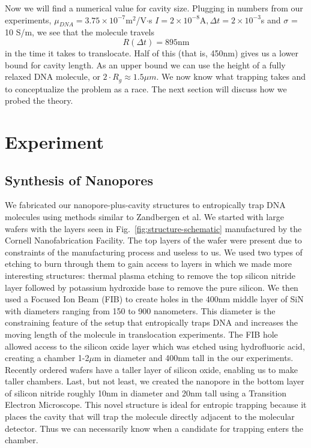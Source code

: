 \documentclass[aps,prl,preprint,groupedaddress]{revtex4}
\begin{document}
Now we will find a numerical value for cavity size.
Plugging in numbers from our experiments, \(\mu_{DNA} = 3.75 \times 10^{-7}\)m$^2$/V$\cdot$s \cite{mobility} \(I = 2\times 10^{-8}\mathrm{A}, \Delta t = 2 \times 10^{-3}\)s and \(\sigma\) = 10 S/m\cite{CRC}, we see that the molecule travels \[R(\Delta t) = 895 \mathrm{nm} \] in the time it takes to translocate.
Half of this (that is, 450nm) gives us a lower bound for cavity length.
As an upper bound we can use the height of a fully relaxed DNA molecule, or $2\cdot R_g \approx 1.5 \mu m$.
We now know what trapping takes and to conceptualize the problem as a race.
The next section will discuss how we probed the theory.

\section{Experiment}

\subsection{Synthesis of Nanopores}

We fabricated our nanopore-plus-cavity structures to entropically trap DNA molecules using methods similar to Zandbergen et al.\cite{nanopore-fabrication}
We started with large wafers with the layers seen in Fig.~\ref{fig:structure-schematic} manufactured by the Cornell Nanofabrication Facility.
The top layers of the wafer were present due to constraints of the manufacturing process and useless to us.
We used two types of etching to burn through them to gain access to layers in which we made more interesting structures: thermal plasma etching to remove the top silicon nitride layer followed by potassium hydroxide base to remove the pure silicon.
We then used a Focused Ion Beam (FIB) to create holes in the 400nm middle layer of SiN with diameters ranging from 150 to 900 nanometers.
This diameter is the constraining feature of the setup that entropically traps DNA and increases the moving length of the molecule in translocation experiments.
The FIB hole allowed access to the silicon oxide layer which was etched using hydrofluoric acid, creating a chamber 1-2\(\mu\)m in diameter and 400nm tall in the our experiments.
Recently ordered wafers have a taller layer of silicon oxide, enabling us to make taller chambers.
Last, but not least, we created the nanopore in the bottom layer of silicon nitride roughly 10nm in diameter and 20nm tall using a Transition Electron Microscope.
This novel structure is ideal for entropic trapping because it places the cavity that will trap the molecule directly adjacent to the molecular detector.
Thus we can necessarily know when a candidate for trapping enters the chamber.
\end{document}
